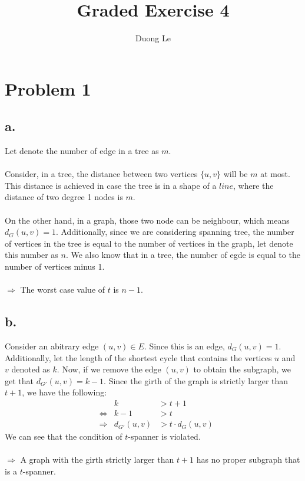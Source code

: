 \documentclass{article}
\title{Graded Exercise 4}
\author{Duong Le}
\date{}
\begin{document}
\maketitle

\section*{Problem 1}
\subsection*{a.}
Let denote the number of edge in a tree as $m$. \\\\
Consider, in a tree, the distance between two vertices $\{u, v\}$ will be $m$ at most. This distance is achieved in case the tree is in a shape of a $line$, where the distance of two degree 1 nodes is $m$. \\\\
On the other hand, in a graph, those two node can be neighbour, which means $d_{G}(u, v) = 1$. Additionally, since we are considering spanning tree, the number of vertices in the tree is equal to the number of vertices in the graph, let denote this number as $n$. We also know that in a tree, the number of egde is equal to the number of vertices minus 1. \\\\
$\Rightarrow$ The worst case value of $t$ is $n-1$.

\pagebreak
\subsection*{b.}
Consider an abitrary edge $(u, v) \in E$. Since this is an edge, $d_{G}(u, v) = 1$. Additionally, let the length of the shortest cycle that contains the vertices $u$ and $v$ denoted as $k$. Now, if we remove the edge $(u, v)$ to obtain the subgraph, we get that $d_{G'}(u, v) = k - 1$. Since the girth of the graph is strictly larger than $t + 1$, we have the following:
\[ 
\begin{aligned}
&                      &     k &> t + 1 \\
&\Leftrightarrow& k - 1 &> t  \\
&\Rightarrow& d_{G'}(u, v) &> t \cdot d_{G}(u, v) \nonumber 
\end{aligned}
\]
We can see that the condition of $t$-spanner is violated. \\\\
$\Rightarrow$ A graph with the girth strictly larger than $t+1$ has no proper subgraph that is a $t$-spanner.
\end{document}
